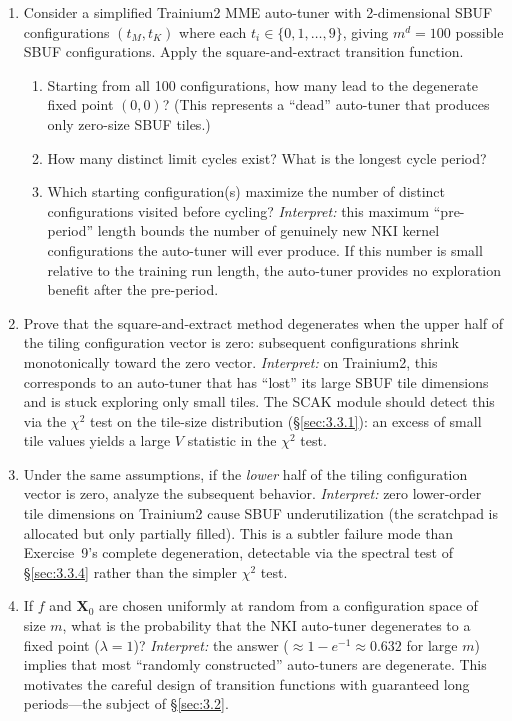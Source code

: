 \documentclass[12pt]{article}
\newcommand{\SBUF}{\textsc{SBUF}}                 %
\newcommand{\MME}{\textsc{MME}}                   %
\begin{document}
\begin{enumerate}
\item[\textbf{8.}] [$HM23$] Consider a simplified Trainium2 \MME{} auto-tuner with 2-dimensional \SBUF{} configurations $(t_M, t_K)$ where each $t_i \in \{0, 1, \ldots, 9\}$, giving $m^d = 100$ possible \SBUF{} configurations. Apply the square-and-extract transition function.

\begin{enumerate}
\item[a)] Starting from all 100 configurations, how many lead to the degenerate fixed point $(0,0)$? (This represents a ``dead'' auto-tuner that produces only zero-size \SBUF{} tiles.)
\item[b)] How many distinct limit cycles exist? What is the longest cycle period?
\item[c)] Which starting configuration(s) maximize the number of distinct configurations visited before cycling? \emph{Interpret:} this maximum ``pre-period'' length bounds the number of genuinely new NKI kernel configurations the auto-tuner will ever produce. If this number is small relative to the training run length, the auto-tuner provides no exploration benefit after the pre-period.
\end{enumerate}

\item[\textbf{9.}] [$M14$] Prove that the square-and-extract method degenerates when the upper half of the tiling configuration vector is zero: subsequent configurations shrink monotonically toward the zero vector. \emph{Interpret:} on Trainium2, this corresponds to an auto-tuner that has ``lost'' its large \SBUF{} tile dimensions and is stuck exploring only small tiles. The SCAK module should detect this via the $\chi^2$ test on the tile-size distribution (\S\ref{sec:3.3.1}): an excess of small tile values yields a large $V$ statistic in the $\chi^2$ test.

\item[\textbf{10.}] [$M16$] Under the same assumptions, if the \emph{lower} half of the tiling configuration vector is zero, analyze the subsequent behavior. \emph{Interpret:} zero lower-order tile dimensions on Trainium2 cause \SBUF{} underutilization (the scratchpad is allocated but only partially filled). This is a subtler failure mode than Exercise~9's complete degeneration, detectable via the spectral test of \S\ref{sec:3.3.4} rather than the simpler $\chi^2$ test.

\item[\textbf{11.}] [$M26$] If $f$ and $\mathbf{X}_0$ are chosen uniformly at random from a configuration space of size $m$, what is the probability that the NKI auto-tuner degenerates to a fixed point ($\lambda = 1$)? \emph{Interpret:} the answer ($\approx 1 - e^{-1} \approx 0.632$ for large $m$) implies that most ``randomly constructed'' auto-tuners are degenerate. This motivates the careful design of transition functions with guaranteed long periods---the subject of \S\ref{sec:3.2}.


\end{enumerate}
\end{document}
